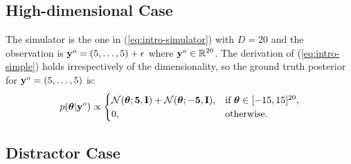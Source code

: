 \subsection{High-dimensional Case}

The simulator is the one in (\ref{eq:intro-simulator}) with $D = 20$ and
the observation is $\mathbf{y}^o = (5, \ldots, 5) + \epsilon$ where $\mathbf{y}^o \in \mathbb{R}^{20}$.
The derivation of (\ref{eq:intro-simple}) holds irrespectively of the dimensionality, so the ground truth posterior for $\mathbf{y}^o = (5, \ldots, 5)$ is:
%
\begin{equation}
  p(\boldsymbol{\theta} | \mathbf{y}^o) \propto
  \begin{cases}
    \mathcal{N}(\boldsymbol{\theta}; \mathbf{5}, \mathbf{I}) + \mathcal{N}(\boldsymbol{\theta}; -\mathbf{5}, \mathbf{I}), & \text{if } \boldsymbol{\theta} \in [-15, 15]^{20}, \\
    0, & \text{otherwise}.
  \end{cases}
  \label{eq:intro-highdim}
\end{equation}
%
\subsection{Distractor Case}

